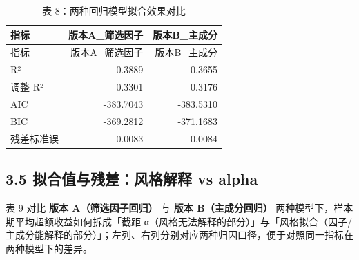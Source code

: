 \documentclass[
]{article}
\begin{document}
\begin{longtable}[]{@{}lrr@{}}
\caption{表 8：两种回归模型拟合效果对比}\tabularnewline
\toprule\noalign{}
指标 & 版本A\_筛选因子 & 版本B\_主成分 \\
\midrule\noalign{}
\endfirsthead
\toprule\noalign{}
指标 & 版本A\_筛选因子 & 版本B\_主成分 \\
\midrule\noalign{}
\endhead
\bottomrule\noalign{}
\endlastfoot
R² & 0.3889 & 0.3655 \\
调整 R² & 0.3301 & 0.3176 \\
AIC & -383.7043 & -383.5310 \\
BIC & -369.2812 & -371.1683 \\
残差标准误 & 0.0083 & 0.0084 \\
\end{longtable}

\subsection{3.5 拟合值与残差：风格解释 vs
alpha}\label{ux62dfux5408ux503cux4e0eux6b8bux5deeux98ceux683cux89e3ux91ca-vs-alpha}

表 9 对比 \textbf{版本 A（筛选因子回归）} 与 \textbf{版本
B（主成分回归）} 两种模型下，样本期平均超额收益如何拆成「截距
α（风格无法解释的部分）」与「风格拟合（因子/主成分能解释的部分）」；左列、右列分别对应两种归因口径，便于对照同一指标在两种模型下的差异。
\end{document}
